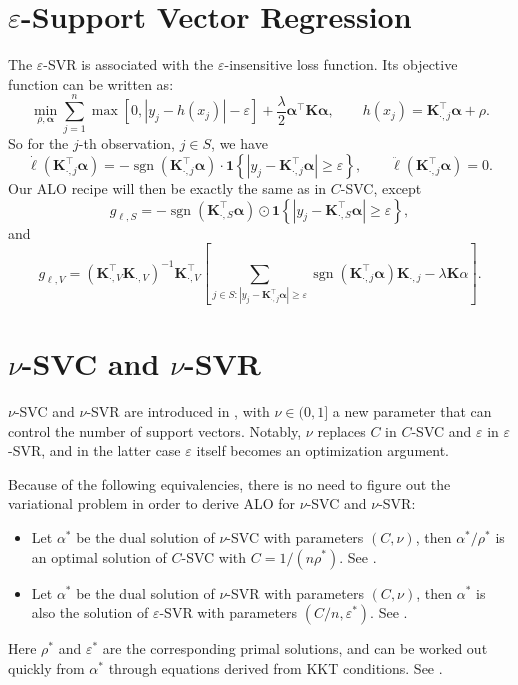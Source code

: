 \documentclass[11pt]{article}
\newcommand{\bK}{\bm{K}}
\newcommand{\balpha}{\bm{\alpha}}
\DeclareMathOperator{\sign}{sgn}
\begin{document}
\section{\(\varepsilon\)-Support Vector Regression}
The \(\varepsilon\)-SVR is associated with the \(\varepsilon\)-insensitive loss function. Its objective function can be written as: 
\begin{equation}
\min_{\rho,\balpha}\sum_{j=1}^{n}\max\left[0, |y_j-h(x_j)|-\varepsilon\right]+\frac{\lambda}{2}\balpha^\top\bK\balpha, \qquad h(x_j)=\bK_{\cdot,j}^\top\balpha+\rho.
\end{equation} 
So for the \(j\)-th observation, \(j\in S\), we have \[\dot{\ell}(\bK_{\cdot,j}^\top\balpha)=-\sign\left(\bK_{\cdot,j}^\top\balpha\right)\cdot\bm{1}\left\{\left|y_j-\bK_{\cdot,j}^\top\balpha\right|\geq\varepsilon\right\},\qquad\ddot{\ell}(\bK_{\cdot,j}^\top\balpha)=0.\] Our ALO recipe will then be exactly the same as in \(C\)-SVC, except \[g_{\ell, S}=-\sign\left(\bK_{\cdot,S}^\top\balpha\right)\odot\bm{1}\left\{\left|y_j-\bK_{\cdot,S}^\top\balpha\right|\geq\varepsilon\right\},\] and \[g_{\ell, V}=\left(\bK_{\cdot,V}^\top\bK_{\cdot,V}\right)^{-1}\bK_{\cdot,V}^\top\left[\sum_{j\in S:\left|y_j-\bK_{\cdot,j}^\top\balpha\right|\geq\varepsilon}\sign\left(\bK_{\cdot,j}^\top\balpha\right)\bK_{\cdot,j}-\lambda\bK\alpha\right].\]

\section{\(\nu\)-SVC and \(\nu\)-SVR}
\(\nu\)-SVC and \(\nu\)-SVR are introduced in \autocite{S2000}, with \(\nu\in(0, 1]\) a new parameter that can control the number of support vectors. Notably, \(\nu\) replaces \(C\) in \(C\)-SVC and \(\varepsilon\) in \(\varepsilon\)-SVR, and in the latter case \(\varepsilon\) itself becomes an optimization argument.

Because of the following equivalencies, there is no need to figure out the variational problem in order to derive ALO for \(\nu\)-SVC and \(\nu\)-SVR:
	\begin{itemize}
	\item Let \(\alpha^\ast\) be the dual solution of \(\nu\)-SVC with parameters \((C,\nu)\), then \(\alpha^\ast/\rho^\ast\) is an optimal solution of \(C\)-SVC with \(C=1/(n\rho^\ast)\). See \autocite{CL2001}.
	\item Let \(\alpha^\ast\) be the dual solution of \(\nu\)-SVR with parameters \((C,\nu)\), then \(\alpha^\ast\) is also the solution of \(\varepsilon\)-SVR with parameters \((C/n,\varepsilon^\ast)\). See \autocite{CL2002}.
	\end{itemize}
Here \(\rho^\ast\) and \(\varepsilon^\ast\) are the corresponding primal solutions, and can be worked out quickly from \(\alpha^\ast\) through equations derived from KKT conditions. See \cite[Section~4.2]{CL2011}.
\end{document}

